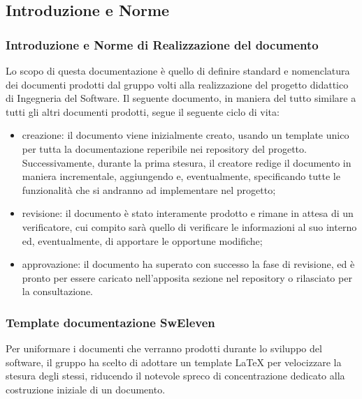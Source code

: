 \subsection{Introduzione e Norme}
\subsubsection{Introduzione e Norme di Realizzazione del documento}
Lo scopo di questa documentazione è quello di definire standard e nomenclatura dei documenti prodotti dal gruppo {\Gruppo}  volti alla realizzazione del progetto didattico di Ingegneria del Software.
Il seguente documento, in maniera del tutto similare a tutti gli altri documenti prodotti, segue il seguente ciclo di vita:
\begin{itemize}
\item creazione: il documento viene inizialmente creato, usando un template unico per tutta la documentazione reperibile nei repository del progetto. Successivamente, durante la prima stesura, il creatore redige il documento in maniera incrementale, aggiungendo e, eventualmente, specificando tutte le funzionalità che si andranno ad implementare nel progetto;
\item revisione: il documento è stato interamente prodotto e rimane in attesa di un verificatore, cui compito sarà quello di verificare le informazioni al suo interno ed, eventualmente, di apportare le opportune modifiche;
\item approvazione: il documento ha superato con successo la fase di revisione, ed è pronto per essere caricato nell’apposita sezione nel repository o rilasciato per la consultazione.
\end{itemize}
\subsubsection{Template documentazione SwEleven}
Per uniformare i documenti che verranno prodotti durante lo sviluppo del software, il gruppo ha scelto di adottare un template \LaTeX{} per velocizzare la stesura degli stessi, riducendo il notevole spreco di concentrazione dedicato alla costruzione iniziale di un documento.